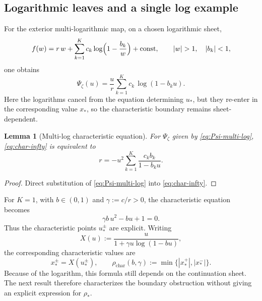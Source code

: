 \documentclass[11pt]{amsart}
\numberwithin{equation}{section}
\theoremstyle{plain}
\newtheorem{lemma}[theorem]{Lemma}
\theoremstyle{definition}
\theoremstyle{remark}
\begin{document}
\subsection{Logarithmic leaves and a single log example}

For the exterior multi-logarithmic map, on a chosen logarithmic sheet,
\begin{equation}\label{eq:multi-log-map}
f(w)=r\,w+\sum_{k=1}^K c_k \log\Bigl(1-\frac{b_k}{w}\Bigr)+\mathrm{const},
\qquad |w|>1,\quad |b_k|<1,
\end{equation}
one obtains
\begin{equation}\label{eq:Psi-multi-log}
\Psi_\zeta(u)=\frac{u}{r}\sum_{k=1}^K c_k\,\log(1-b_k u).
\end{equation}
Here the logarithms cancel from the equation determining \(u_*\), but they re-enter in the
corresponding value \(x_*\), so the characteristic boundary remains sheet-dependent.

\begin{lemma}[Multi-log characteristic equation]\label{lem:char-multi-log}
For \(\Psi_\zeta\) given by \eqref{eq:Psi-multi-log}, \eqref{eq:char-infty} is equivalent to
\begin{equation}\label{eq:char-multi-log-rational}
r=-u^2\sum_{k=1}^K \frac{c_k b_k}{1-b_k u}.
\end{equation}
\end{lemma}

\begin{proof}
Direct substitution of \eqref{eq:Psi-multi-log} into \eqref{eq:char-infty}.
\end{proof}

For \(K=1\), with \(b\in(0,1)\) and \(\gamma:=c/r>0\), the characteristic equation becomes
\begin{equation}\label{eq:char-one-log-quadratic}
\gamma b\,u^2-bu+1=0.
\end{equation}
Thus the characteristic points \(u_*^\pm\) are explicit. Writing
\begin{equation}\label{eq:X-one-log}
X(u):=\frac{u}{1+\gamma u\log(1-bu)},
\end{equation}
the corresponding characteristic values are
\begin{equation}\label{eq:xstar-one-log}
x_*^\pm=X(u_*^\pm),
\qquad
\rho_{\mathrm{char}}(b,\gamma):=\min\{|x_*^+|,|x_*^-|\}.
\end{equation}
Because of the logarithm, this formula still depends on the continuation sheet. The next result therefore characterizes the boundary obstruction without giving an explicit expression for $\rho_*$.
\end{document}
